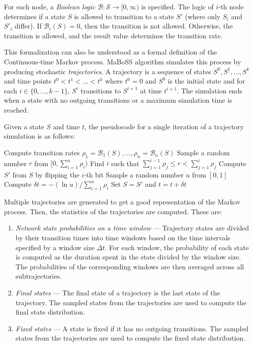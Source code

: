 \documentclass[times, twoside]{zHenriquesLab-StyleBioRxiv}
\begin{document}
For each node, a \emph{Boolean logic} $\mathcal{B}: \mathcal{S} \rightarrow [0, \infty)$ is specified. The logic of $i$-th node determines if a state $S$ is allowed to transition to a state $S'$ (where only $S_i$ and $S'_i$ differ). If $\mathcal{B}_i(S) = 0$, then the transition is not allowed. Otherwise, the transition is allowed, and the result value determines the transition rate.

This formalization can also be understood as a formal definition of the Continuous-time Markov process. MaBoSS algorithm simulates this process by producing stochastic \emph{trajectories}. A trajectory is a sequence of states $S^0, S^1, \dots, S^k$ and time points $t^0 < t^1 < \dots < t^k$ where $t^0 = 0$ and $S^0$ is the initial state and for each $i \in \{0, \dots, k-1\}$, $S^i$ transitions to $S^{i+1}$ at time $t^{i+1}$. The simulation ends when a state with no outgoing transitions or a maximum simulation time is reached.

Given a state $S$ and time $t$, the pseudocode for a single iteration of a trajectory simulation is as follows:
\begin{algorithmic}[1]
\State Compute transition rates $\rho_1 = \mathcal{B}_1(S), \dots, \rho_n = \mathcal{B}_n(S)$
\State Sample a random number $r$ from $[0, \sum_{i=1}^n \rho_i)$
\State Find $i$ such that $\sum_{j=1}^{i-1} \rho_j \leq r < \sum_{j=1}^{i} \rho_j$
\State Compute $S'$ from $S$ by flipping the $i$-th bit
\State Sample a random number $u$ from $[0, 1]$
\State Compute $\delta t = -(\ln u) / \sum_{i=1}^n \rho_i$
\State Set $S = S'$ and $t = t + \delta t$
\end{algorithmic}

Multiple trajectories are generated to get a good representation of the Markov process. Then, the statistics of the trajectories are computed. These are:

\begin{enumerate}
    \item \emph{Network state probabilities on a time window} --- Trajectory states are divided by their transition times into time windows based on the time intervals specified by a window size $\Delta t$. For each window, the probability of each state is computed as the duration spent in the state divided by the window size. The probabilities of the corresponding windows are then averaged across all subtrajectories.
    \item \emph{Final states} --- The final state of a trajectory is the last state of the trajectory. The sampled states from the trajectories are used to compute the final state distribution.
    \item \emph{Fixed states} --- A state is fixed if it has no outgoing transitions. The sampled states from the trajectories are used to compute the fixed state distribution.
\end{enumerate}
\end{document}
